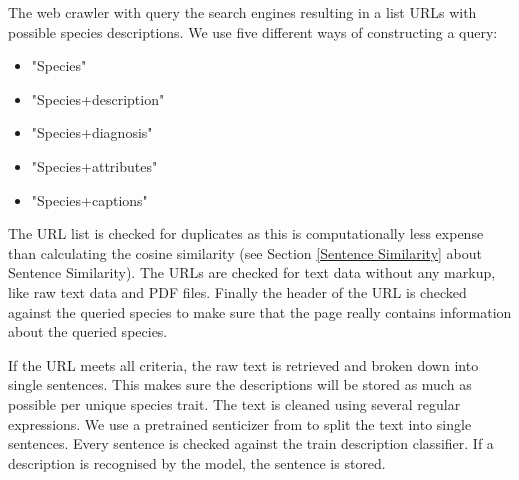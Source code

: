 \documentclass[a4paper, 12pt, oneside]{book} %
\begin{document}
The web crawler with query the search engines resulting in a list URLs with possible species descriptions.
We use five different ways of constructing a query:
\begin{itemize}
    \item "Species"
    \item "Species+description"
    \item "Species+diagnosis"
    \item "Species+attributes"
    \item "Species+captions"
\end{itemize}
The URL list is checked for duplicates as this is computationally less expense than calculating the cosine similarity (see Section \ref{Sentence Similarity} about Sentence Similarity).
The URLs are checked for text data without any markup, like raw text data and PDF files.
Finally the header of the URL is checked against the queried species to make sure that the page really contains information about the queried species.

If the URL meets all criteria, the raw text is retrieved and broken down into single sentences. 
This makes sure the descriptions will be stored as much as possible per unique species trait.
The text is cleaned using several regular expressions.
We use a pretrained senticizer from \textcite{wolf_huggingfaces_2020} to split the text into single sentences.
Every sentence is checked against the train description classifier.
If a description is recognised by the model, the sentence is stored.
\end{document}

